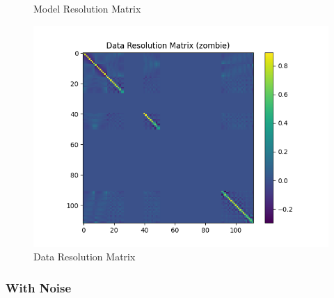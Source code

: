 \documentclass{article}
\begin{document}
\begin{itemize}
\begin{figure}[h]
    \caption{Model Resolution Matrix}
\end{figure}
\begin{figure}[h]
    \centering
    \includegraphics[width=1\textwidth]{images/outputs/datares/zombie.png}
    \caption{Data Resolution Matrix}
\end{figure}
\clearpage
\end{itemize}

\subsubsection{With Noise}
\end{document}
